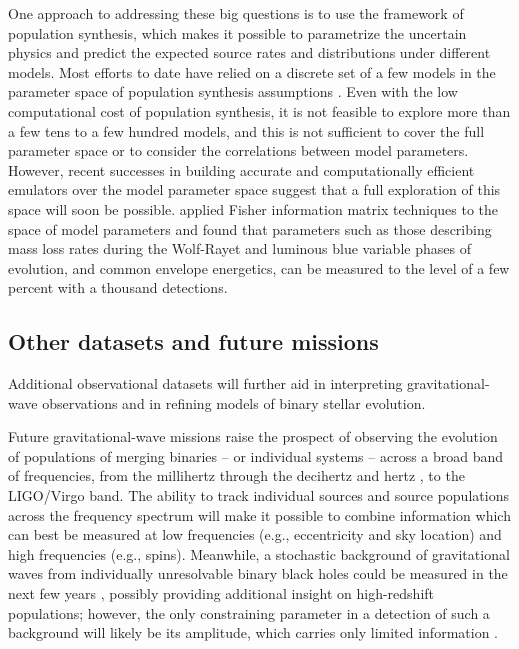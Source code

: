 \documentclass[iop,onecolumn]{revtex4-1}
\begin{document}
One approach to addressing these big questions is to use the framework of population synthesis, which makes it possible to parametrize the uncertain physics and predict the expected source rates and distributions under different models.  Most efforts to date have relied on a discrete set of a few models in the parameter space of population synthesis assumptions \citep[e.g.,][]{Dominik:2012,Stevenson:2015}.  Even with the low computational cost of population synthesis, it is not feasible to explore more than a few tens to a few hundred models, and this is not sufficient to cover the full parameter space or to consider the correlations between model parameters.  However, recent successes in building accurate and computationally efficient emulators over the model parameter space \citep{Barrett:2017} suggest that a full exploration of this space will soon be possible. \citet{Barrett:2017FIM} applied Fisher information matrix techniques to the space of model parameters and found that parameters such as those describing mass loss rates during the Wolf-Rayet and luminous blue variable phases of evolution, and common envelope energetics, can be measured to the level of a few percent with a thousand detections. 

\subsection{Other datasets and future missions}
Additional observational datasets will further aid in interpreting gravitational-wave observations and in refining models of binary stellar evolution.

Future gravitational-wave missions raise the prospect of observing the evolution of populations of merging binaries -- or individual systems -- across a broad band of frequencies, from the millihertz \citep[e.g.,][]{Sesana:2016} through the decihertz \citep{Mandel:2017} and hertz \citep{ET:2012}, to the LIGO/Virgo band.  The ability to track individual sources and source populations across the frequency spectrum will make it possible to combine information which can best be measured at low frequencies (e.g., eccentricity and sky location) and high frequencies (e.g., spins).  Meanwhile, a stochastic background of gravitational waves from individually unresolvable binary black holes could be measured in the next few years \citep{GW150914:stoch}, possibly providing additional insight on high-redshift populations; however, the only constraining parameter in a detection of such a background will likely be its amplitude, which carries only limited information \citep{Callister:2016}.
\end{document}
